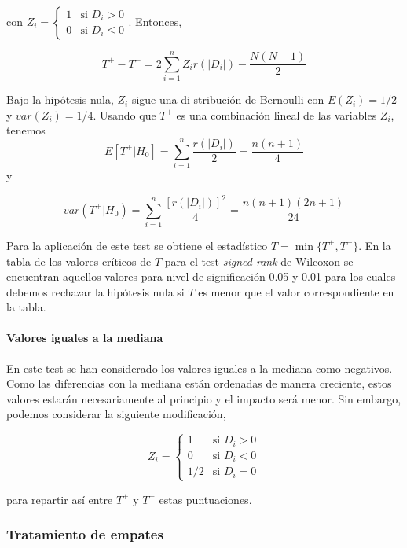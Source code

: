 	 con $ Z_i = \left\lbrace \begin{array}{ll}
	 				1 & \text{si } D_i > 0 \\
	 				0 & \text{si } D_i \leq 0
	 		\end{array} \right.$. Entonces,
	 		
	\[ T^+  - T^- = 2 \sum\limits_{i=1}^n
					 Z_i r(|D_i|) - \frac{N(N+1)}{2} \]
	
	Bajo la hipótesis nula, $Z_i$ sigue una di stribución de Bernoulli con $E(Z_i) = 1/2$ y $var(Z_i) = 1/4$. Usando que $T^+$ es una combinación lineal de las variables $Z_i$, tenemos
	\[ E[ T^+ | H_0 ] = \sum\limits_{i=1}^n 
						\frac{r(|D_i|)}{2} 
					= \frac{n(n+1)}{4}			\]
	y
	
	\[ var( T^+ | H_0 ) = \sum\limits_{i=1}^n 
						\frac{[r(|D_i|)]^2}{4} 
					= \frac{n(n+1)(2n+1)}{24}	\]
					
	Para la aplicación de este test se obtiene el estadístico $T = \min \{ T^+, T^- \}$. En la tabla de los valores críticos de $T$ para el test \textit{signed-rank} de Wilcoxon \cite[Tabla A5]{SHESKIN11} se encuentran aquellos valores para nivel de significación 0.05 y 0.01 para los cuales debemos rechazar la hipótesis nula si $T$ es menor que el valor correspondiente en la tabla.\\
	
\paragraph{Valores iguales a la mediana} En este test se han considerado los valores iguales a la mediana como negativos. Como las diferencias con la mediana están ordenadas de manera creciente, estos valores estarán necesariamente al principio y el impacto será menor. Sin embargo, podemos considerar la siguiente modificación,

	\[ Z_i = \left\lbrace \begin{array}{ll}
	 				1 & \text{si } D_i > 0 \\
	 				0 & \text{si } D_i < 0 \\
	 				1/2 & \text{si } D_i = 0 
	 		\end{array} \right. 					\]
	
	para repartir así entre $T^+$ y $T^-$ estas puntuaciones. 
	
\subsubsection{Tratamiento de empates}
	
